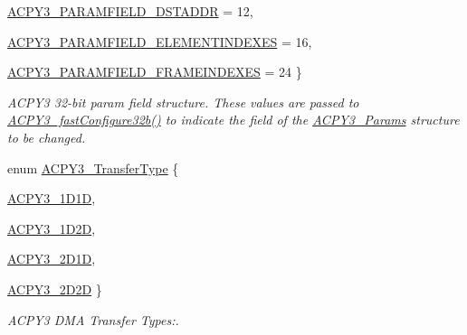\begin{CompactItemize}
\hyperlink{group___d_s_p_a_c_p_y3_gg96f43d4bc010da2d1bb9dc08ea828de0927624fccb072b2ff847a10c4729fedf}{ACPY3\_\-PARAMFIELD\_\-DSTADDR} =  12, 
\par
\hyperlink{group___d_s_p_a_c_p_y3_gg96f43d4bc010da2d1bb9dc08ea828de0ce2eb39c83c77fa1ee38d5c87e045e83}{ACPY3\_\-PARAMFIELD\_\-ELEMENTINDEXES} =  16, 
\par
\hyperlink{group___d_s_p_a_c_p_y3_gg96f43d4bc010da2d1bb9dc08ea828de088347f099298128f5989f76636e64dc5}{ACPY3\_\-PARAMFIELD\_\-FRAMEINDEXES} =  24
 \}
\begin{CompactList}\small\item\em ACPY3 32-bit param field structure. These values are passed to \hyperlink{group___d_s_p_a_c_p_y3_g2ad7ed5dc554a991c4c11f644f5a8272}{ACPY3\_\-fast\-Configure32b()} to indicate the field of the \hyperlink{struct_a_c_p_y3___params}{ACPY3\_\-Params} structure to be changed. \item\end{CompactList}\item 
enum \hyperlink{group___d_s_p_a_c_p_y3_gbe2d02fcbde983c823b138f20667cbfc}{ACPY3\_\-Transfer\-Type} \{ \par
\hyperlink{group___d_s_p_a_c_p_y3_ggbe2d02fcbde983c823b138f20667cbfcf9cef75ab1829399370006a48d16182e}{ACPY3\_\-1D1D}, 
\par
\hyperlink{group___d_s_p_a_c_p_y3_ggbe2d02fcbde983c823b138f20667cbfc7e3376fb0def5e38484dfb121e7b2fb7}{ACPY3\_\-1D2D}, 
\par
\hyperlink{group___d_s_p_a_c_p_y3_ggbe2d02fcbde983c823b138f20667cbfc3ad50651b016c2c96f8fb6f724213623}{ACPY3\_\-2D1D}, 
\par
\hyperlink{group___d_s_p_a_c_p_y3_ggbe2d02fcbde983c823b138f20667cbfcd8ac84d79831cfe53a4088a321989a85}{ACPY3\_\-2D2D}
 \}
\begin{CompactList}\small\item\em ACPY3 DMA Transfer Types:. \item\end{CompactList}\end{CompactItemize}
